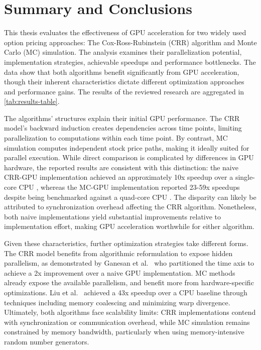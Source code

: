 \documentclass[english,12pt,a4paper,pdftex,sci,utf8]{aaltothesis}
\begin{document}
\section{Summary and Conclusions}  \label{sec:summary-conclusions}
This thesis evaluates the effectiveness of GPU acceleration for two widely used option pricing approaches: The Cox-Ross-Rubinstein (CRR) algorithm and Monte Carlo (MC) simulation. The analysis examines their parallelization potential, implementation strategies, achievable speedups and performance bottlenecks. The data show that both algorithms benefit significantly from GPU acceleration, though their inherent characteristics dictate different optimization approaches and performance gains. The results of the reviewed research are aggregated in \cref{tab:results-table}.

The algorithms' structures explain their initial GPU performance. The CRR model's backward induction creates dependencies across time points, limiting parallelization to computations within each time point. By contrast, MC simulation computes independent stock price paths, making it ideally suited for parallel execution. While direct comparison is complicated by differences in GPU hardware, the reported results are consistent with this distinction: the naive CRR-GPU implementation achieved an approximately 10x speedup over a single-core CPU \cite{pharr2005gpu}, whereas the MC-GPU implementation reported 23-59x speedups despite being benchmarked against a quad-core CPU \cite{nguyen2007gpu}. The disparity can likely be attributed to synchronization overhead affecting the CRR algorithm. Nonetheless, both naive implementations yield substantial improvements relative to implementation effort, making GPU acceleration worthwhile for either algorithm. 

Given these characteristics, further optimization strategies take different forms. The CRR model benefits from algorithmic reformulation to expose hidden parallelism, as demonstrated by Ganesan et al.\ \cite{ganesan2009acceleration} who partitioned the time axis to achieve a 2x improvement over a naive GPU implementation. MC methods already expose the available parallelism, and benefit more from hardware-specific optimizations. Liu et al.\ \cite{liu2010efficient} achieved a 43x speedup over a CPU baseline through techniques including memory coalescing and minimizing warp divergence. Ultimately, both algorithms face scalability limits: CRR implementations contend with synchronization or communication overhead, while MC simulation remains constrained by memory bandwidth, particularly when using memory-intensive random number generators.
\end{document}
